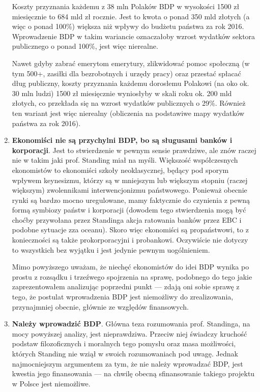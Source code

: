 \documentclass[11pt]{article}
\begin{document}
\begin{enumerate}
		\par Koszty przyznania każdemu z 38 mln Polaków BDP w wysokości 1500 zł miesięcznie to 684 mld zł rocznie. Jest to kwota o ponad 350 mld złotych (a więc o ponad 100\%) większa niż wpływy do budżetu państwa za rok 2016. Wprowadzenie BDP w takim wariancie oznaczałoby wzrost wydatków sektora publicznego o ponad 100\%, jest więc nierealne.
		\par Nawet gdyby zabrać emerytom emerytury, zlikwidować pomoc społeczną (w tym 500+, zasiłki dla bezrobotnych i urzędy pracy) oraz przestać spłacać dług publiczny, koszty przyznania każdemu dorosłemu Polakowi (na oko ok. 30 mln ludzi) 1500 zł miesięcznie wyniosłyby w skali roku ok. 200 mld złotych, co przekłada się na wzrost wydatków publicznych o 29\%. Również ten wariant jest więc nierealny (obliczenia na podstawiwe mapy wydatków państwa za rok 2016).
		\item \textbf{Ekonomiści nie są przychylni BDP, bo są sługusami banków i korporacji}. Jest to stwierdzenie w pewnym sensie prawdziwe, ale znów raczej nie w takim jaki prof. Standing miał na myśli. Większość współczesnych ekonomistów to ekonomiści szkoły neoklasycznej, będący pod sporym wpływem keynesizmu, którzy są w mniejszym lub większym stopniu (raczej większym) zwolennikami interwencjonizmu państwowego. Ponieważ obecnie rynki są bardzo mocno uregulowane, mamy faktycznie do czynienia z pewną formą symbiozy państw i korporacji (dowodem tego stwierdzenia mogą być choćby przywołana przez Standinga akcja ratowania banków przez EBC i podobne sytuacje zza oceanu). Skoro więc ekonomiści są propaństwowi, to z konieczności są także prokorporacyjni i probankowi. Oczywiście nie dotyczy to wszystkich bez wyjątku i jest jedynie pewnym uogólnieniem.
		\par Mimo powyższego uważam, że niechęć ekonomistów do idei BDP wynika po prostu z rozsądku i trzeźwego spojrzenia na sprawę, podobnego do tego jakie zaprezentowałem analizując poprzedni punkt — zdają oni sobie sprawę z tego, że postulat wprowadzenia BDP jest niemożliwy do zrealizowania, przynajmniej obecnie, głównie ze względów finansowych.
		\item \textbf{Należy wprowadzić BDP}. Główna teza rozumowania prof. Standinga, na mocy powyższej analizy, jest nieprawdziwa. Przeciw niej świadczy kruchość podstaw filozoficznych i moralnych tego pomysłu oraz masa możliwości, których Standing nie wziął w swoich rozumowaniach pod uwagę. Jednak najmocniejszym argumentem za tym, że nie należy wprowadzać BDP, jest kwestia jego finansowania — na chwilę obecną sfinansowanie takiego projektu w Polsce jest niemożliwe.
	\end{enumerate}
\end{document}
